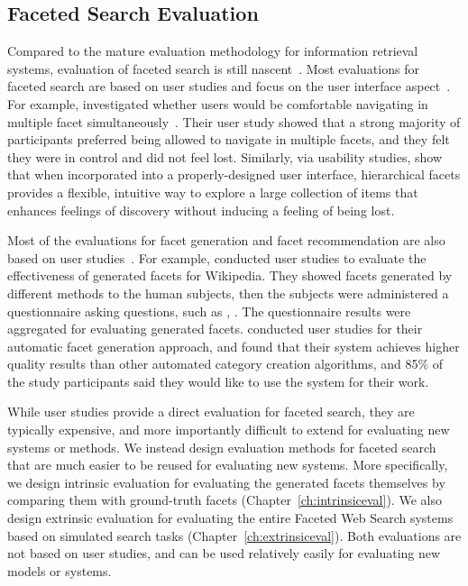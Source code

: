 \subsection{Faceted Search Evaluation}
Compared to the mature evaluation methodology for information retrieval systems, evaluation of faceted search is still nascent~\cite{wilson2009bridging,tunkelang2009faceted}. Most evaluations for faceted search are based on user studies and focus on the user interface aspect~\cite{burke1996knowledge,english2002hierarchical,hearst2006design,yee2003faceted,hearst2008uis,kules2009exploratory}.
For example, \citet{english2002hierarchical} investigated whether users would be comfortable navigating in multiple facet simultaneously~\cite{english2002hierarchical}. Their user study showed that a strong majority of participants preferred being allowed to navigate in multiple facets, and they felt they were in control and did not feel lost. Similarly, via usability studies, \citet{yee2003faceted} show that when incorporated into a properly-designed user interface, hierarchical facets provides a flexible, intuitive way to explore a large collection of items that enhances feelings of discovery without inducing a feeling of being lost.

Most of the evaluations for facet generation and facet recommendation are also based on user studies~\cite{li2010facetedpedia,stoica2007automating}. For example, \citet{li2010facetedpedia} conducted user studies to evaluate the effectiveness of generated facets for Wikipedia. They showed facets generated by different methods to the human subjects, then the subjects were administered a questionnaire asking questions, such as , . The questionnaire results were aggregated for evaluating generated facets. \citet{stoica2007automating} conducted user studies for their automatic facet generation approach, and found that their system achieves higher quality results than other automated category creation algorithms, and 85\% of the study participants said they would like to use the system for their work.

While user studies provide a direct evaluation for faceted search, they are typically expensive, and more importantly difficult to extend for evaluating new systems or methods. We instead design evaluation methods for faceted search that are much easier to be reused for evaluating new systems. More specifically, we design intrinsic evaluation for evaluating the generated facets themselves by comparing them with ground-truth facets (Chapter~\ref{ch:intrinsiceval}). We also design extrinsic evaluation for evaluating the entire Faceted Web Search systems based on simulated search tasks (Chapter~\ref{ch:extrinsiceval}). Both evaluations are not based on user studies, and can be used relatively easily for evaluating new models or systems.
 
